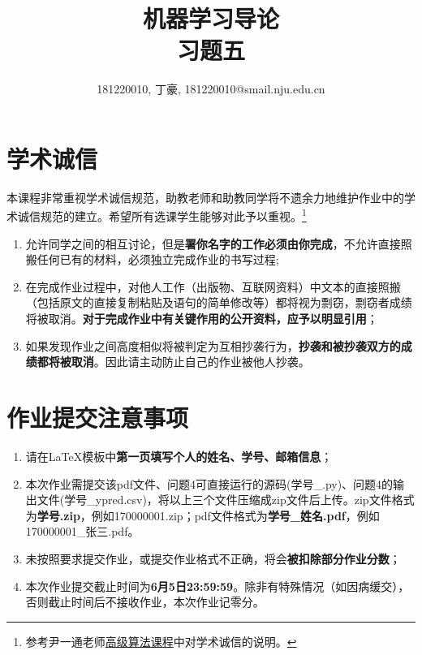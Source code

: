 \documentclass[a4paper,UTF8]{article}
\theoremstyle{definition}
\begin{document}
\title{机器学习导论\\习题五}
\author{181220010, 丁豪, 181220010@smail.nju.edu.cn}
\maketitle


\section*{学术诚信}

本课程非常重视学术诚信规范，助教老师和助教同学将不遗余力地维护作业中的学术诚信规范的建立。希望所有选课学生能够对此予以重视。\footnote{参考尹一通老师\href{http://tcs.nju.edu.cn/wiki/}{高级算法课程}中对学术诚信的说明。}

\begin{tcolorbox}
	\begin{enumerate}
		\item[(1)] 允许同学之间的相互讨论，但是{\color{red}\textbf{署你名字的工作必须由你完成}}，不允许直接照搬任何已有的材料，必须独立完成作业的书写过程;
		\item[(2)] 在完成作业过程中，对他人工作（出版物、互联网资料）中文本的直接照搬（包括原文的直接复制粘贴及语句的简单修改等）都将视为剽窃，剽窃者成绩将被取消。{\color{red}\textbf{对于完成作业中有关键作用的公开资料，应予以明显引用}}；
		\item[(3)] 如果发现作业之间高度相似将被判定为互相抄袭行为，{\color{red}\textbf{抄袭和被抄袭双方的成绩都将被取消}}。因此请主动防止自己的作业被他人抄袭。
	\end{enumerate}
\end{tcolorbox}

\section*{作业提交注意事项}
\begin{tcolorbox}
	\begin{enumerate}
		\item[(1)] 请在LaTeX模板中{\color{red}\textbf{第一页填写个人的姓名、学号、邮箱信息}}；
		\item[(2)] 本次作业需提交该pdf文件、问题4可直接运行的源码(学号\_.py)、问题4的输出文件(学号\_ypred.csv)，将以上三个文件压缩成zip文件后上传。zip文件格式为{\color{red}\textbf{学号.zip}}，例如170000001.zip；pdf文件格式为{\color{red}\textbf{学号\_姓名.pdf}}，例如170000001\_张三.pdf。
		\item[(3)] 未按照要求提交作业，或提交作业格式不正确，将会{\color{red}\textbf{被扣除部分作业分数}}；
		\item[(4)] 本次作业提交截止时间为{\color{red}\textbf{6月5日23:59:59}}。除非有特殊情况（如因病缓交），否则截止时间后不接收作业，本次作业记零分。
	\end{enumerate}
\end{tcolorbox}
\end{document}
